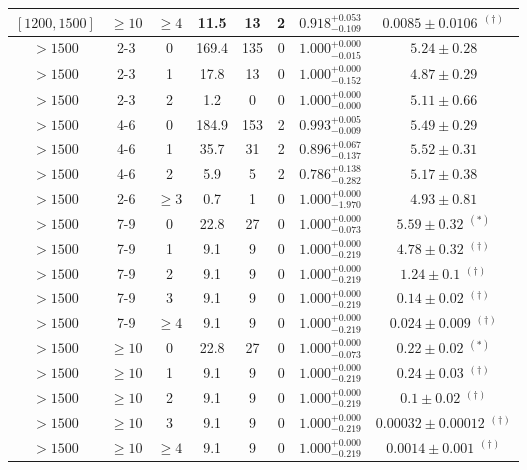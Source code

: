 \begin{table}[!htbp]
{\begin{tabular}{ccc|ccccc}
$[1200,1500]$ & $\geq10$ & $\geq4$ & 11.5 & 13 & 2 & $0.918^{+0.053}_{-0.109}$ & $0.0085 \pm 0.0106$ $^{(\dagger)}$ \\ 
\hline 
${>}1500$ & 2-3 & 0 & 169.4 & 135 & 0 & $1.000^{+0.000}_{-0.015}$ & $5.24 \pm 0.28$ \\ 
${>}1500$ & 2-3 & 1 & 17.8 & 13 & 0 & $1.000^{+0.000}_{-0.152}$ & $4.87 \pm 0.29$ \\ 
${>}1500$ & 2-3 & 2 & 1.2 & 0 & 0 & $1.000^{+0.000}_{-0.000}$ & $5.11 \pm 0.66$ \\ 
${>}1500$ & 4-6 & 0 & 184.9 & 153 & 2 & $0.993^{+0.005}_{-0.009}$ & $5.49 \pm 0.29$ \\ 
${>}1500$ & 4-6 & 1 & 35.7 & 31 & 2 & $0.896^{+0.067}_{-0.137}$ & $5.52 \pm 0.31$ \\ 
${>}1500$ & 4-6 & 2 & 5.9 & 5 & 2 & $0.786^{+0.138}_{-0.282}$ & $5.17 \pm 0.38$ \\ 
${>}1500$ & 2-6 & $\geq3$ & 0.7 & 1 & 0 & $1.000^{+0.000}_{-1.970}$ & $4.93 \pm 0.81$ \\ 
${>}1500$ & 7-9 & 0 & 22.8 & 27 & 0 & $1.000^{+0.000}_{-0.073}$ & $5.59 \pm 0.32$ $^{(*)}$ \\ 
${>}1500$ & 7-9 & 1 & 9.1 & 9 & 0 & $1.000^{+0.000}_{-0.219}$ & $4.78 \pm 0.32$ $^{(\dagger)}$ \\ 
${>}1500$ & 7-9 & 2 & 9.1 & 9 & 0 & $1.000^{+0.000}_{-0.219}$ & $1.24 \pm 0.1$ $^{(\dagger)}$ \\ 
${>}1500$ & 7-9 & 3 & 9.1 & 9 & 0 & $1.000^{+0.000}_{-0.219}$ & $0.14 \pm 0.02$ $^{(\dagger)}$ \\ 
${>}1500$ & 7-9 & $\geq4$ & 9.1 & 9 & 0 & $1.000^{+0.000}_{-0.219}$ & $0.024 \pm 0.009$ $^{(\dagger)}$ \\ 
${>}1500$ & $\geq10$ & 0 & 22.8 & 27 & 0 & $1.000^{+0.000}_{-0.073}$ & $0.22 \pm 0.02$ $^{(*)}$ \\ 
${>}1500$ & $\geq10$ & 1 & 9.1 & 9 & 0 & $1.000^{+0.000}_{-0.219}$ & $0.24 \pm 0.03$ $^{(\dagger)}$ \\ 
${>}1500$ & $\geq10$ & 2 & 9.1 & 9 & 0 & $1.000^{+0.000}_{-0.219}$ & $0.1 \pm 0.02$ $^{(\dagger)}$ \\ 
${>}1500$ & $\geq10$ & 3 & 9.1 & 9 & 0 & $1.000^{+0.000}_{-0.219}$ & $0.00032 \pm 0.00012$ $^{(\dagger)}$ \\ 
${>}1500$ & $\geq10$ & $\geq4$ & 9.1 & 9 & 0 & $1.000^{+0.000}_{-0.219}$ & $0.0014 \pm 0.001$ $^{(\dagger)}$ \\ 
\hline
\end{tabular}
}
\end{table}
